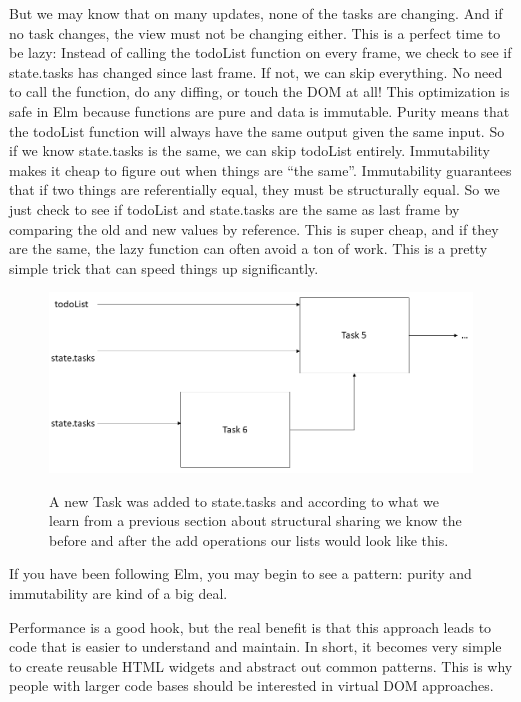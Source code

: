 \documentclass[12pt,twoside]{article}
\begin{document}
But we may know that on many updates, none of the tasks are changing. And if no task changes, the view must not be changing either. This is a perfect time to be lazy:
Instead of calling the todoList function on every frame, we check to see if state.tasks has changed since last frame. If not, we can skip everything. No need to call the function, do any diffing, or touch the DOM at all! This optimization is safe in Elm because functions are pure and data is immutable.
Purity means that the todoList function will always have the same output given the same input. So if we know state.tasks is the same, we can skip todoList entirely.
Immutability makes it cheap to figure out when things are “the same”. Immutability guarantees that if two things are referentially equal, they must be structurally equal.
So we just check to see if todoList and state.tasks are the same as last frame by comparing the old and new values by reference. This is super cheap, and if they are the same, the lazy function can often avoid a ton of work. This is a pretty simple trick that can speed things up significantly.
\begin{figure}[H]
    \begin{center}
        {\includegraphics[scale=0.55]{refeq.png}}
       \end{center}
       \caption{ \label{figure:3} A new Task was added to state.tasks and according to what we learn from a previous section about structural sharing we know the before and after the add operations our lists would look like this.}
\end{figure}
If you have been following Elm, you may begin to see a pattern: purity and immutability are kind of a big deal.

Performance is a good hook, but the real benefit is that this approach leads to code that is easier to understand and maintain. In short, it becomes very simple to create reusable HTML widgets and abstract out common patterns. This is why people with larger code bases should be interested in virtual DOM approaches.
\end{document}
